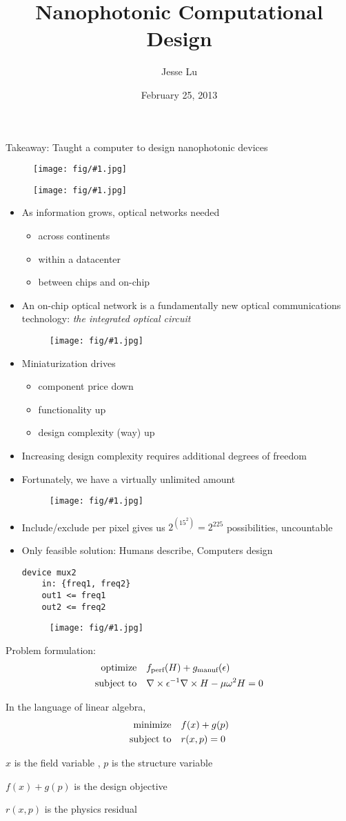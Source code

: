 \documentclass[landscape]{foils}
\title{Nanophotonic Computational Design}
\author{Jesse Lu}
\date{February 25, 2013}
\renewcommand{\oursection}[1]{
\foilhead[-1.0cm]{#1}
}
\newcommand{\myfig}[1]{
    \begin{figure}[!h]
    \centerline{\texttt{[image: fig/\#1.jpg]}}
    \end{figure}
}
\newcommand{\BI}{\begin{itemize}\item}
\newcommand{\I}{\item}
\newcommand{\EI}{\end{itemize}}
\begin{document}
\setlength{\parskip}{0cm}
\maketitle


\vfill
\newpage

Takeaway: Taught a computer to design nanophotonic devices
\myfig{placeholder}
\vfill
\newpage

\oursection{Part 1: Motivation}
\myfig{optical_networks}
\BI As information grows, optical networks needed
    \BI across continents
    \I  within a datacenter
    \I  between chips and on-chip \EI
\newpage

\I  An on-chip optical network is a fundamentally new optical communications
    technology: \emph{the integrated optical circuit}
\myfig{integrated_circuit}
\I  Miniaturization drives
    \BI component price down
    \I  functionality up
    \I  design complexity (way) up \EI
\newpage

\I  Increasing design complexity requires additional degrees of freedom
\I  Fortunately, we have a virtually unlimited amount
\myfig{des_complexity}
\I  Include/exclude per pixel gives us $2^{(15^2)} = 2^{225}$ possibilities, 
    uncountable
\vfill
\newpage

\I  Only feasible solution: Humans describe, Computers design

\begin{verbatim}
device mux2 
    in: {freq1, freq2}
    out1 <= freq1
    out2 <= freq2
\end{verbatim}

\myfig{placeholder}

    
    
\EI
Problem formulation:
    \begin{subequations}\begin{align}
    \mbox{optimize} \quad & f_\text{perf}(H) + 
                            g_\text{manuf}(\epsilon) \\
    \mbox{subject to}\quad & \nabla \times \epsilon^{-1} \nabla \times H -
                        \mu \omega^2 H = 0
    \end{align}\end{subequations}

In the language of linear algebra,
    \begin{subequations}\begin{align}
    \mbox{minimize}\quad & f(x) + g(p) \\
    \mbox{subject to}\quad & r(x, p) = 0
    \end{align}\end{subequations}
\BIT
\item $x$ is the field variable , $p$ is the {structure} variable
\item $f(x) + g(p)$ is the {design objective}
\item $r(x,p)$ is the {physics residual}
\EIT
\newpage
    
\end{document}
